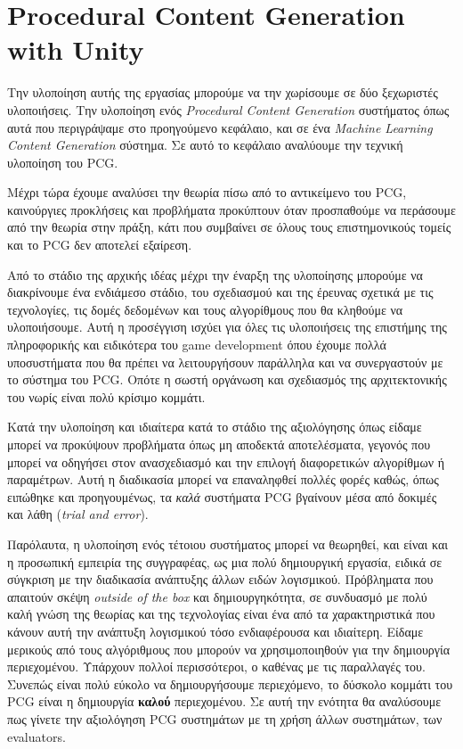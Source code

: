 \thispagestyle{empty}

\chapter{Procedural Content Generation with Unity}

Την υλοποίηση αυτής της εργασίας μπορούμε να την χωρίσουμε σε δύο ξεχωριστές υλοποιήσεις. Την υλοποίηση ενός \textit{Procedural Content Generation} συστήματος όπως αυτά που περιγράψαμε στο προηγούμενο κεφάλαιο, και σε ένα \textit{Machine Learning Content Generation} σύστημα. Σε αυτό το κεφάλαιο αναλύουμε την τεχνική υλοποίηση του PCG.
\par
Μέχρι τώρα έχουμε αναλύσει την θεωρία πίσω από το αντικείμενο του PCG, καινούργιες προκλήσεις και προβλήματα προκύπτουν όταν προσπαθούμε να περάσουμε από την θεωρία στην πράξη, κάτι που συμβαίνει σε όλους τους επιστημονικούς τομείς και το PCG δεν αποτελεί  εξαίρεση.
\par
Από το στάδιο της αρχικής ιδέας μέχρι την έναρξη της υλοποίησης μπορούμε να διακρίνουμε ένα ενδιάμεσο στάδιο, του σχεδιασμού και της έρευνας σχετικά με τις τεχνολογίες, τις δομές δεδομένων και τους αλγορίθμους που θα κληθούμε να υλοποιήσουμε. Αυτή η προσέγγιση ισχύει για όλες τις υλοποιήσεις της επιστήμης της πληροφορικής και ειδικότερα του game development όπου έχουμε πολλά υποσυστήματα που θα πρέπει να λειτουργήσουν παράλληλα και να συνεργαστούν με το σύστημα του PCG. Οπότε η σωστή οργάνωση και σχεδιασμός της αρχιτεκτονικής του νωρίς είναι πολύ κρίσιμο κομμάτι.
\par
Κατά την υλοποίηση και ιδιαίτερα κατά το στάδιο της αξιολόγησης όπως είδαμε μπορεί να προκύψουν προβλήματα όπως μη αποδεκτά αποτελέσματα, γεγονός που μπορεί να οδηγήσει στον ανασχεδιασμό και την επιλογή διαφορετικών αλγορίθμων ή παραμέτρων. Αυτή η διαδικασία μπορεί να επαναληφθεί πολλές φορές καθώς, όπως ειπώθηκε και προηγουμένως, τα \textit{καλά} συστήματα PCG βγαίνουν μέσα από δοκιμές και λάθη (\textit{trial and error}).
\par
Παρόλαυτα, η υλοποίηση ενός τέτοιου συστήματος μπορεί να θεωρηθεί, και είναι και η προσωπική εμπειρία της συγγραφέας, ως μια πολύ δημιουργική εργασία, ειδικά σε σύγκριση με την διαδικασία ανάπτυξης άλλων ειδών λογισμικού. Πρόβληματα που απαιτούν σκέψη \textit{outside of the box} και δημιουργηκότητα, σε συνδυασμό με πολύ καλή γνώση της θεωρίας και της τεχνολογίας είναι ένα από τα χαρακτηριστικά που κάνουν αυτή την ανάπτυξη λογισμικού τόσο ενδιαφέρουσα και ιδιαίτερη.
Είδαμε μερικούς από τους αλγόριθμους που μπορούν να χρησιμοποιηθούν για την δημιουργία περιεχομένου. Υπάρχουν πολλοί περισσότεροι, ο καθένας με τις παραλλαγές του. Συνεπώς είναι πολύ εύκολο να δημιουργήσουμε περιεχόμενο, το δύσκολο κομμάτι του PCG είναι η δημιουργία \textbf{καλού} περιεχομένου. Σε αυτή την ενότητα θα αναλύσουμε πως γίνετε την αξιολόγηση PCG συστημάτων με τη χρήση άλλων συστημάτων, των evaluators.

